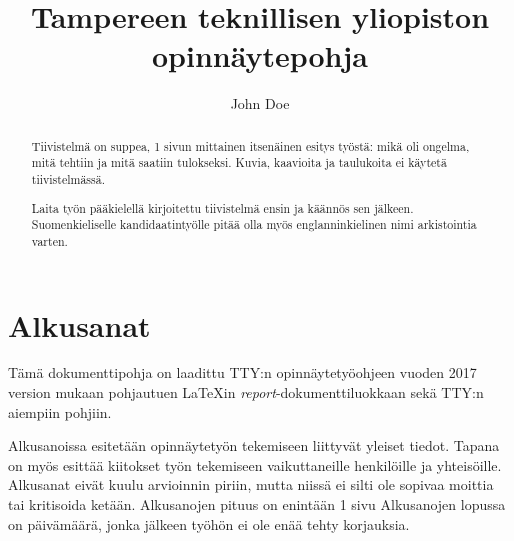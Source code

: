 \documentclass[globalnumbering,centeredcaptions,draftfooter]{tutthesis/tutthesis} %
\author{John Doe}
\title{Tampereen teknillisen yliopiston opinnäytepohja}
\begin{document}
\maketitle



\begin{abstract}
Tiivistelmä on suppea, 1 sivun mittainen itsenäinen esitys työstä: mikä oli ongelma, mitä tehtiin ja mitä saatiin tulokseksi.
Kuvia, kaavioita ja taulukoita ei käytetä tiivistelmässä.

Laita työn pääkielellä kirjoitettu tiivistelmä ensin ja käännös sen jälkeen.
Suomenkieliselle kandidaatintyölle pitää olla myös englanninkielinen nimi arkistointia varten.
\end{abstract}

\iffalse
\begin{otherlanguage}{english}

\title{Tampere University of Technology thesis template}
\programme{...}
\thesisdescription{...}
\major{Mathematics}
\examiner{Professor Vilma Välkky\and Professor Matti Meikäläinen}
\keywords{thesis, template, thesis structure, thesis layout}

\begin{abstract}
The abstract is a self-contained, concise description of the thesis: what was the problem, what was done, what was the result.
Do not include charts or tables in the abstract.

First include the abstract written in the main language of the thesis and then the translation.
A bachelor's thesis in Finnish must also have a name in English for archival.
\end{abstract}
\end{otherlanguage}
\fi


\chapter*{Alkusanat}

Tämä dokumenttipohja on laadittu TTY:n opinnäytetyöohjeen vuoden 2017 version mukaan pohjautuen LaTeXin \emph{report}-dokumenttiluokkaan sekä TTY:n aiempiin pohjiin.

Alkusanoissa esitetään opinnäytetyön tekemiseen liittyvät yleiset tiedot.
Tapana on myös esittää kiitokset työn tekemiseen vaikuttaneille henkilöille ja yhteisöille.
Alkusanat eivät kuulu arvioinnin piriin, mutta niissä ei silti ole sopivaa moittia tai kritisoida ketään.
Alkusanojen pituus on enintään 1 sivu
Alkusanojen lopussa on päivämäärä, jonka jälkeen työhön ei ole enää tehty korjauksia.
\end{document}
